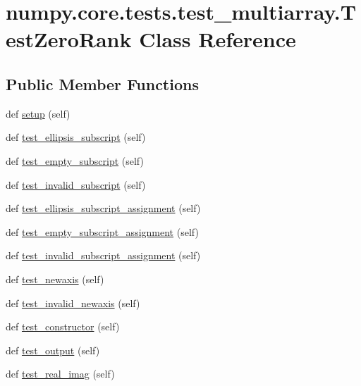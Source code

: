 \hypertarget{classnumpy_1_1core_1_1tests_1_1test__multiarray_1_1TestZeroRank}{}\section{numpy.\+core.\+tests.\+test\+\_\+multiarray.\+Test\+Zero\+Rank Class Reference}
\label{classnumpy_1_1core_1_1tests_1_1test__multiarray_1_1TestZeroRank}
\subsection*{Public Member Functions}
\begin{DoxyCompactItemize}
\item 
def \hyperlink{classnumpy_1_1core_1_1tests_1_1test__multiarray_1_1TestZeroRank_ab0fb4bec4c7b756f24a7205230cc1bd3}{setup} (self)
\item 
def \hyperlink{classnumpy_1_1core_1_1tests_1_1test__multiarray_1_1TestZeroRank_ae113832ac175baa827f0e6d5252a81a0}{test\+\_\+ellipsis\+\_\+subscript} (self)
\item 
def \hyperlink{classnumpy_1_1core_1_1tests_1_1test__multiarray_1_1TestZeroRank_a53494671bebb620ad0824567e110a756}{test\+\_\+empty\+\_\+subscript} (self)
\item 
def \hyperlink{classnumpy_1_1core_1_1tests_1_1test__multiarray_1_1TestZeroRank_aa87e4b0be171d962514d68523dd0c70a}{test\+\_\+invalid\+\_\+subscript} (self)
\item 
def \hyperlink{classnumpy_1_1core_1_1tests_1_1test__multiarray_1_1TestZeroRank_a8db6949900fb054b5ce897c03b2cf974}{test\+\_\+ellipsis\+\_\+subscript\+\_\+assignment} (self)
\item 
def \hyperlink{classnumpy_1_1core_1_1tests_1_1test__multiarray_1_1TestZeroRank_a371c3ede709c39faf40841b1f41ef1f2}{test\+\_\+empty\+\_\+subscript\+\_\+assignment} (self)
\item 
def \hyperlink{classnumpy_1_1core_1_1tests_1_1test__multiarray_1_1TestZeroRank_a6f9fffe7e3f5fa80678eb2090cd25568}{test\+\_\+invalid\+\_\+subscript\+\_\+assignment} (self)
\item 
def \hyperlink{classnumpy_1_1core_1_1tests_1_1test__multiarray_1_1TestZeroRank_a4e2cb59c3d81366e1c5a5e30084dcede}{test\+\_\+newaxis} (self)
\item 
def \hyperlink{classnumpy_1_1core_1_1tests_1_1test__multiarray_1_1TestZeroRank_a59e2f668d29a6524e4604051a266df16}{test\+\_\+invalid\+\_\+newaxis} (self)
\item 
def \hyperlink{classnumpy_1_1core_1_1tests_1_1test__multiarray_1_1TestZeroRank_a18e9d3724b97dcc25512a271a40ef077}{test\+\_\+constructor} (self)
\item 
def \hyperlink{classnumpy_1_1core_1_1tests_1_1test__multiarray_1_1TestZeroRank_a5a71eacf9e33310a0d8c0e6c032b2122}{test\+\_\+output} (self)
\item 
def \hyperlink{classnumpy_1_1core_1_1tests_1_1test__multiarray_1_1TestZeroRank_aebbea8855fc4e4e0b6044f7b13bad8d2}{test\+\_\+real\+\_\+imag} (self)
\end{DoxyCompactItemize}
